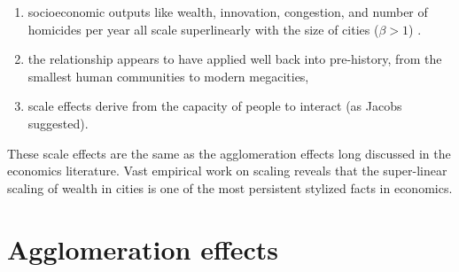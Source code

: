 \begin{enumerate}
 \item socioeconomic outputs like wealth, innovation, congestion, and number of homicides per year all scale superlinearly with the size of cities ($\beta > 1$) \cite{gomez-lievanoStatisticsUrbanScaling2012}. %
\item the relationship appears to have applied well back into pre-history, from the smallest human communities to modern megacities, %
\item scale effects derive from the capacity of people to interact (as Jacobs suggested).
\end{enumerate}
These scale effects are the same as the agglomeration effects long discussed in the economics literature. Vast empirical work on scaling reveals that the super-linear scaling of wealth in cities is one of the most persistent stylized facts in economics. 




\section{Agglomeration effects}



